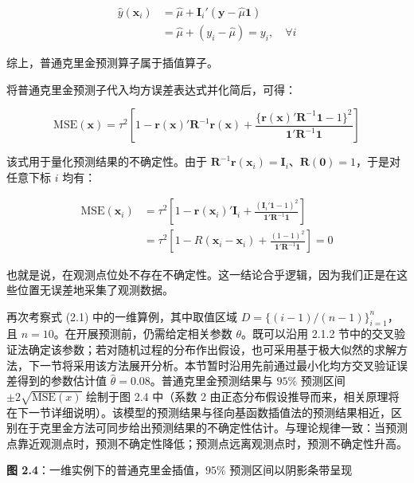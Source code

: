 \documentclass{ctexart}
\begin{document}
\begin{align*}
\widehat{y}(\boldsymbol{x}_{i})&=\widehat{\mu}+\boldsymbol{I}_{i}'(\boldsymbol{y}-\widehat{\mu}\boldsymbol{1})\\
&=\widehat{\mu}+(y_{i}-\widehat{\mu})=y_{i},\quad\forall i
\end{align*}

综上，普通克里金预测算子属于插值算子。

将普通克里金预测子代入均方误差表达式并化简后，可得：

\begin{equation*}
\mathrm{MSE}(\boldsymbol{x})=\tau^2\left[
1-\boldsymbol{r}(\boldsymbol{x})'\boldsymbol{R}^{-1}\boldsymbol{r}(\boldsymbol{x})
+\frac{\{\boldsymbol{r}(\boldsymbol{x})'\boldsymbol{R}^{-1}\boldsymbol{1}-1\}^2}{\boldsymbol{1}'\boldsymbol{R}^{-1}\boldsymbol{1}}
\right]
\tag{2.16}
\end{equation*}

该式用于量化预测结果的不确定性。由于 $\boldsymbol{R}^{-1}\boldsymbol{r}(\boldsymbol{x}_i)=\boldsymbol{I}_i$、$\boldsymbol{R}(\boldsymbol{0})=1$，于是对任意下标 $i$ 均有：

\begin{align*}
\mathrm{MSE}(\boldsymbol{x}_i)&=\tau^2\left[1-\boldsymbol{r}(\boldsymbol{x}_i)'\boldsymbol{I}_i
+\frac{(\boldsymbol{I}_i'\boldsymbol{1}-1)^2}{\boldsymbol{1}'\boldsymbol{R}^{-1}\boldsymbol{1}}\right]\\
&=\tau^2\left[1-R(\boldsymbol{x}_i-\boldsymbol{x}_i)+\frac{(1-1)^2}{\boldsymbol{1}'\boldsymbol{R}^{-1}\boldsymbol{1}}\right]=0
\end{align*}

也就是说，在观测点位处不存在不确定性。这一结论合乎逻辑，因为我们正是在这些位置无误差地采集了观测数据。

再次考察式 (2.1) 中的一维算例，其中取值区域 $D=\{(i-1)/(n-1)\}_{i=1}^n$，且 $n=10$。在开展预测前，仍需给定相关参数 $\theta$。既可以沿用 2.1.2 节中的交叉验证法确定该参数；若对随机过程的分布作出假设，也可采用基于极大似然的求解方法，下一节将采用该方法展开分析。本节暂时沿用先前通过最小化均方交叉验证误差得到的参数估计值 $\widehat{\theta}=0.08$。普通克里金预测结果与 $95\%$ 预测区间 $\pm2\sqrt{\mathrm{MSE}(x)}$ 绘制于图 2.4 中（系数 2 由正态分布假设推导而来，相关原理将在下一节详细说明）。该模型的预测结果与径向基函数插值法的预测结果相近，区别在于克里金方法可同步给出预测结果的不确定性估计。与理论规律一致：当预测点靠近观测点时，预测不确定性降低；预测点远离观测点时，预测不确定性升高。

\begin{mdquote}
\textbf{图 2.4}：一维实例下的普通克里金插值，$95\%$ 预测区间以阴影条带呈现
\end{mdquote}
\end{document}
